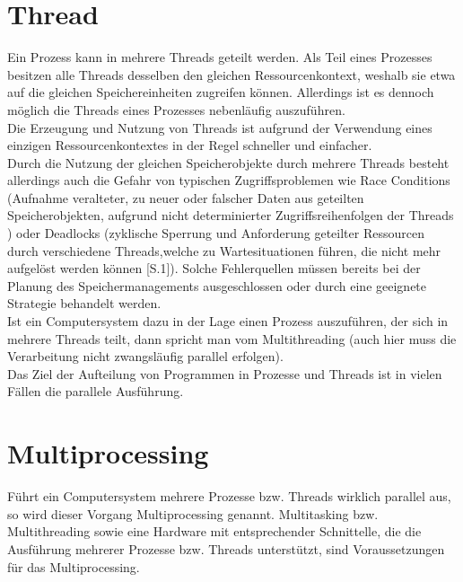 \section{Thread}
Ein Prozess kann in mehrere Threads geteilt werden. Als Teil eines Prozesses besitzen alle Threads desselben den gleichen Ressourcenkontext, weshalb sie etwa auf die gleichen Speichereinheiten zugreifen können. Allerdings ist es dennoch möglich die Threads eines Prozesses nebenläufig auszuführen.\\
Die Erzeugung und Nutzung von Threads ist aufgrund der Verwendung eines einzigen Ressourcenkontextes in der Regel schneller und einfacher.\\
Durch die Nutzung der gleichen Speicherobjekte durch mehrere Threads besteht allerdings auch die Gefahr von typischen Zugriffsproblemen wie Race Conditions (Aufnahme veralteter, zu neuer oder falscher Daten aus geteilten Speicherobjekten, aufgrund nicht determinierter Zugriffsreihenfolgen der Threads \cite{Rouse_race_condition}) oder Deadlocks (zyklische Sperrung und Anforderung geteilter Ressourcen durch verschiedene Threads,welche zu Wartesituationen führen, die nicht mehr aufgelöst werden können \cite{Szwillus_Deadlocks}[S.1]). Solche Fehlerquellen müssen bereits bei der Planung des Speichermanagements ausgeschlossen oder durch eine geeignete Strategie behandelt werden.\\
Ist ein Computersystem dazu in der Lage einen Prozess auszuführen, der sich in mehrere Threads teilt, dann spricht man vom Multithreading (auch hier muss die Verarbeitung nicht zwangsläufig parallel erfolgen).\\
Das Ziel der Aufteilung von Programmen in Prozesse und Threads ist in vielen Fällen die parallele Ausführung.

\section{Multiprocessing}
Führt ein Computersystem mehrere Prozesse bzw. Threads wirklich parallel aus, so wird dieser Vorgang Multiprocessing genannt. Multitasking bzw. Multithreading sowie eine Hardware mit entsprechender Schnittelle, die die Ausführung mehrerer Prozesse bzw. Threads unterstützt, sind Voraussetzungen für das Multiprocessing.
